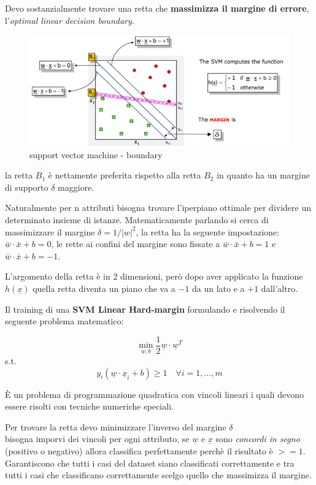 Devo sostanzialmente trovare una retta che \textbf{massimizza il margine di errore}, l'\textit{optimal linear decision boundary}. 

\begin{figure}[H]
	\hspace{-0.5cm}
	\includegraphics[height=0.45 \linewidth]{classification/pict/svm_boundary.png}
	\caption{support vector machine - boundary}
\end{figure}

la retta $B_1$ è nettamente preferita rispetto alla retta $B_2$ in quanto ha un margine di supporto $\delta$ maggiore. 

Naturalmente per n attributi bisogna trovare l'iperpiano ottimale per dividere un determinato insieme di istanze. Matematicamente parlando si cerca di massimizzare il margine $\delta = 1 / |w|^2$, la retta ha la seguente impostazione: $\bar{w} \cdot \bar{x} + b = 0$, le rette ai confini del margine sono fissate a $\bar{w} \cdot \bar{x} + b = 1$ e $\bar{w} \cdot \bar{x} + b = -1$. 

L'argomento della retta \`e in 2 dimensioni, per\`o dopo aver applicato la funzione $h(\underline{x})$ quella retta diventa un piano che va a $-1$ da un lato e a $+1$ dall'altro.

Il training di una \textbf{SVM Linear Hard-margin} formulando e risolvendo il seguente problema matematico: 

\[ \min_{\underline{w},b} \frac{1}{2}\underline{w} \cdot \underline{w}^T \]
\qquad s.t.
\[ y_i (\underline{w} \cdot \underline{x}_i + b) \ge 1 \quad \forall i = 1, ..., m\]

È un problema di programmazione quadratica con vincoli lineari i quali devono essere risolti con tecniche numeriche speciali.

Per trovare la retta devo minimizzare l'inverso del margine $\delta$\\
bisogna imporvi dei vincoli per ogni attributo, se $\underline{w}$ e $\underline{x}$ sono \textit{concordi in segno} (positivo o negativo) allora classifica perfettamente perch\`e il risultato è $>= 1$. Garantiscono che tutti i casi del dataset siano classificati correttamente e tra tutti i casi che classificano correttamente scelgo quello che massimizza il margine. 

